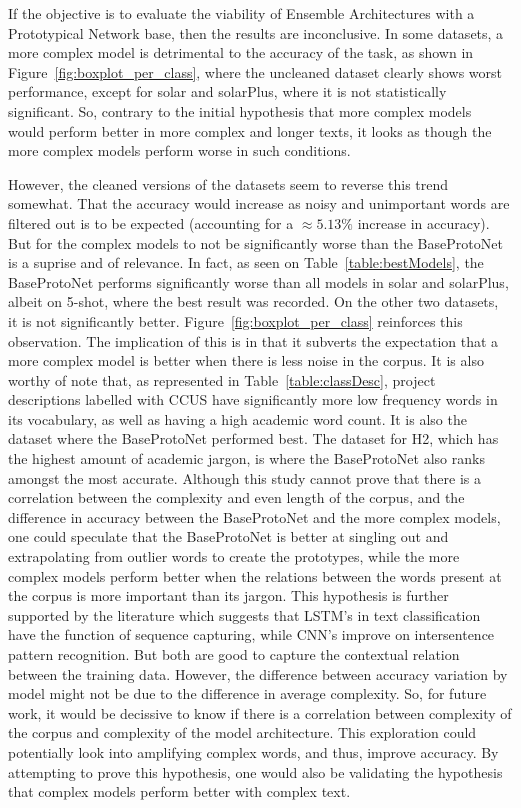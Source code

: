 \documentclass[manuscript, anonymous=true, review=true]{acmart}
\begin{document}
If the objective is to evaluate
the viability of Ensemble Architectures with a Prototypical Network base, then the results are inconclusive. In some datasets, a more complex model is detrimental
to the accuracy of the task, as shown in Figure~\ref{fig:boxplot_per_class}, where the uncleaned dataset clearly shows worst performance, except for solar and solarPlus, where it is not statistically significant.
So, contrary to the initial hypothesis that more complex models would perform better in more complex and longer texts, it looks as though the more complex models perform worse in such conditions.

However, the cleaned versions of the datasets seem to reverse this trend somewhat. That the accuracy would increase as noisy and unimportant words are filtered out is to be expected (accounting for a $\approx 5.13\%$ increase in accuracy). 
But for the complex models to not be significantly worse than the BaseProtoNet is a suprise and of relevance.
In fact, as seen on Table~\ref{table:bestModels}, the BaseProtoNet performs significantly worse than all models in solar and solarPlus, albeit on 5-shot, where the best result was recorded. On the other two datasets, it is not significantly better. Figure~\ref{fig:boxplot_per_class} reinforces this observation.
The implication of this 
is in that it subverts the expectation that a more complex model is better when there is less noise in the corpus. It is also worthy of note that, as represented in Table~\ref{table:classDesc}, project descriptions labelled with CCUS
have significantly more low frequency words in its vocabulary, as well as having a high academic word count. It is also the dataset where the BaseProtoNet performed best. 
The dataset for H2, which has the highest amount of academic jargon, is where the BaseProtoNet also ranks amongst the most accurate. Although this study cannot prove that there is a correlation between the complexity and even length of the corpus, and the difference in accuracy between the BaseProtoNet and the more complex models, one could speculate that the BaseProtoNet is better at singling out and extrapolating from outlier words to create the prototypes, while the more complex models perform better when the relations between the words present at the corpus is more important than its jargon.
This hypothesis 
is further supported 
by the literature which suggests 
that LSTM's in text classification have the function of sequence capturing\cite{Xue2022-pw}, while CNN's improve on intersentence pattern recognition\cite{zhou2015clstmneuralnetworktext}. But both are good to capture the contextual relation between the training data\cite{KAUR2023108699}.
However, the difference between accuracy variation by model might not be due to the difference in average complexity. So, for future work, it would be decissive to know if there is a correlation between complexity of the corpus and complexity of the model architecture. This exploration could potentially look into amplifying complex words, and thus, improve accuracy. By attempting to prove this hypothesis, one would also be validating the hypothesis that complex models perform better with complex text.  
\end{document}
